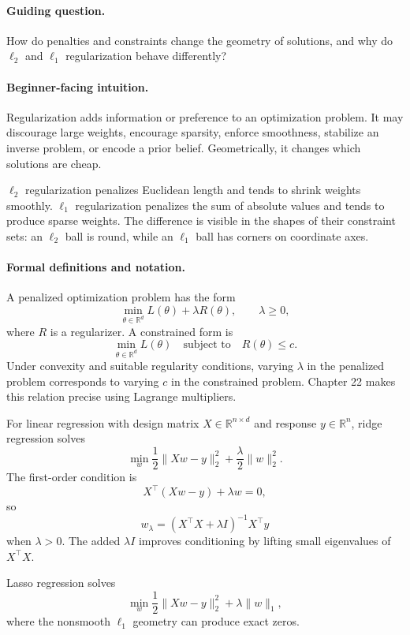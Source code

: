 \paragraph{Guiding question.}
How do penalties and constraints change the geometry of solutions, and why do \(\ell_2\) and \(\ell_1\) regularization behave differently?

\paragraph{Beginner-facing intuition.}
Regularization adds information or preference to an optimization problem. It may discourage large weights, encourage sparsity, enforce smoothness, stabilize an inverse problem, or encode a prior belief. Geometrically, it changes which solutions are cheap.

\(\ell_2\) regularization penalizes Euclidean length and tends to shrink weights smoothly. \(\ell_1\) regularization penalizes the sum of absolute values and tends to produce sparse weights. The difference is visible in the shapes of their constraint sets: an \(\ell_2\) ball is round, while an \(\ell_1\) ball has corners on coordinate axes.

\paragraph{Formal definitions and notation.}
A penalized optimization problem has the form
\[
\min_{\theta\in\mathbb R^d}
L(\theta)+\lambda R(\theta),
\qquad \lambda\ge 0,
\]
where \(R\) is a regularizer. A constrained form is
\[
\min_{\theta\in\mathbb R^d}L(\theta)
\quad\text{subject to}\quad
R(\theta)\le c.
\]
Under convexity and suitable regularity conditions, varying \(\lambda\) in the penalized problem corresponds to varying \(c\) in the constrained problem. Chapter 22 makes this relation precise using Lagrange multipliers.

For linear regression with design matrix \(X\in\mathbb R^{n\times d}\) and response \(y\in\mathbb R^n\), ridge regression solves
\[
\min_w \frac12\|Xw-y\|_2^2+\frac{\lambda}{2}\|w\|_2^2.
\]
The first-order condition is
\[
X^\top(Xw-y)+\lambda w=0,
\]
so
\[
\boxed{
w_\lambda=(X^\top X+\lambda I)^{-1}X^\top y
}
\]
when \(\lambda>0\). The added \(\lambda I\) improves conditioning by lifting small eigenvalues of \(X^\top X\).

Lasso regression solves
\[
\min_w \frac12\|Xw-y\|_2^2+\lambda\|w\|_1,
\]
where the nonsmooth \(\ell_1\) geometry can produce exact zeros.

